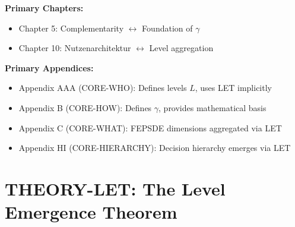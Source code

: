 \begin{tcolorbox}[colback=purple!5!white, colframe=purple!75!black,
    title=Chapter Linkage]

\textbf{Primary Chapters:}
\begin{itemize}[nosep]
\item Chapter 5: Complementarity $\leftrightarrow$ Foundation of $\gamma$
\item Chapter 10: Nutzenarchitektur $\leftrightarrow$ Level aggregation
\end{itemize}

\textbf{Primary Appendices:}
\begin{itemize}[nosep]
\item Appendix AAA (CORE-WHO): Defines levels $L$, uses LET implicitly
\item Appendix B (CORE-HOW): Defines $\gamma$, provides mathematical basis
\item Appendix C (CORE-WHAT): FEPSDE dimensions aggregated via LET
\item Appendix HI (CORE-HIERARCHY): Decision hierarchy emerges via LET
\end{itemize}

\end{tcolorbox}


\chapter{THEORY-LET: The Level Emergence Theorem}
\label{app:theory-let}


\begin{abstract}
Why is a team more than a collection of individuals? Why does a family generate
welfare beyond the sum of its members? This appendix provides a formal answer:
the \textbf{Level Emergence Theorem (LET)}. We prove that when complementarity
is positive ($\bar{\gamma} > 0$), aggregate utility at level $L$ strictly exceeds
the sum of utilities at level $L-1$. This ``emergence premium'' $\mathcal{E}$
is quantifiable and depends on the variance of member utilities and the strength
of complementarity. The theorem provides the mathematical foundation for the
EBF framework's treatment of multi-level welfare aggregation.
\end{abstract}

